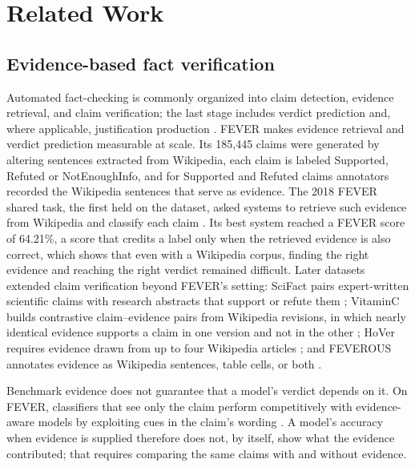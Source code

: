 \section{Related Work}
\label{sec:related}

\subsection{Evidence-based fact verification}
Automated fact-checking is commonly organized into claim detection, evidence retrieval, and claim verification; the last stage includes verdict prediction and, where applicable, justification production \citep{guo-etal-2022-survey}.
FEVER \citep{thorne-etal-2018-fever} makes evidence retrieval and verdict prediction measurable at scale.
Its 185{,}445 claims were generated by altering sentences extracted from Wikipedia, each claim is labeled Supported, Refuted or NotEnoughInfo, and for Supported and Refuted claims annotators recorded the Wikipedia sentences that serve as evidence.
The 2018 FEVER shared task, the first held on the dataset, asked systems to retrieve such evidence from Wikipedia and classify each claim \citep{thorne-etal-2018-fact}.
Its best system reached a FEVER score of 64.21\%, a score that credits a label only when the retrieved evidence is also correct, which shows that even with a Wikipedia corpus, finding the right evidence and reaching the right verdict remained difficult.
Later datasets extended claim verification beyond FEVER's setting: SciFact pairs expert-written scientific claims with research abstracts that support or refute them \citep{wadden-etal-2020-fact}; VitaminC builds contrastive claim--evidence pairs from Wikipedia revisions, in which nearly identical evidence supports a claim in one version and not in the other \citep{schuster-etal-2021-get}; HoVer requires evidence drawn from up to four Wikipedia articles \citep{jiang-etal-2020-hover}; and FEVEROUS annotates evidence as Wikipedia sentences, table cells, or both \citep{aly-etal-2021-feverous}.

Benchmark evidence does not guarantee that a model's verdict depends on it.
On FEVER, classifiers that see only the claim perform competitively with evidence-aware models by exploiting cues in the claim's wording \citep{schuster-etal-2019-towards}.
A model's accuracy when evidence is supplied therefore does not, by itself, show what the evidence contributed; that requires comparing the same claims with and without evidence.

